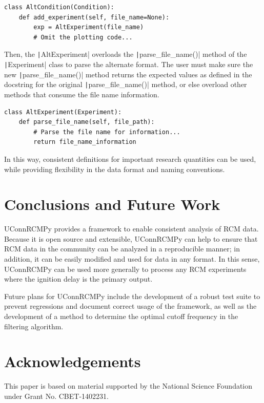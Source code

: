 \documentclass[12pt]{../ussci}
\begin{document}
\begin{verbatim}
class AltCondition(Condition):
    def add_experiment(self, file_name=None):
        exp = AltExperiment(file_name)
        # Omit the plotting code...
\end{verbatim}

Then, the \texttt|AltExperiment| overloads the
\texttt|parse_file_name()| method of the \texttt|Experiment| class to
parse the alternate format. The user must make sure the new
\texttt|parse_file_name()| method returns the expected values as
defined in the docstring for the original \texttt|parse_file_name()|
method, or else overload other methods that consume the file name
information.

\begin{verbatim}
class AltExperiment(Experiment):
    def parse_file_name(self, file_path):
        # Parse the file name for information...
        return file_name_information
\end{verbatim}

In this way, consistent definitions for important research quantities
can be used, while providing flexibility in the data format and naming
conventions.

\section{Conclusions and Future Work}\label{conclusions-and-future-work}

UConnRCMPy provides a framework to enable consistent analysis of RCM
data. Because it is open source and extensible, UConnRCMPy can help to
ensure that RCM data in the community can be analyzed in a reproducible
manner; in addition, it can be easily modified and used for data in any
format. In this sense, UConnRCMPy can be used more generally to process
any RCM experiments where the ignition delay is the primary output.

Future plans for UConnRCMPy include the development of a robust test
suite to prevent regressions and document correct usage of the
framework, as well as the development of a method to determine the
optimal cutoff frequency in the filtering algorithm.

\section{Acknowledgements}\label{acknowledgements}

This paper is based on material supported by the National Science
Foundation under Grant No. CBET-1402231.

\printbibliography
\end{document}
